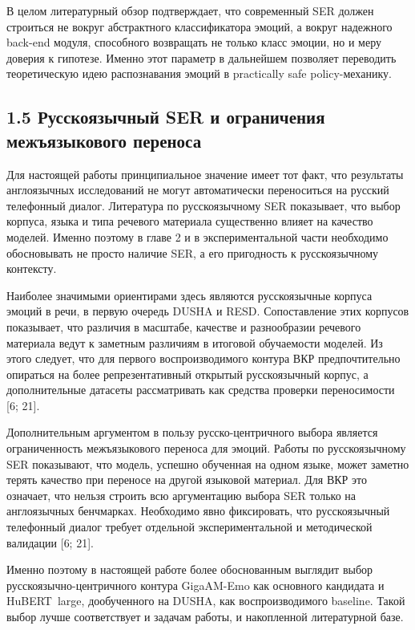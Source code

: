 \documentclass[a4paper,14pt]{extarticle}
\renewcommand{\texttt}[1]{\textnormal{#1}}
\begin{document}
В целом литературный обзор подтверждает, что современный \texttt{SER}
должен строиться не вокруг абстрактного классификатора эмоций, а вокруг
надежного back-end модуля, способного возвращать не только класс эмоции,
но и меру доверия к гипотезе. Именно этот параметр в дальнейшем
позволяет переводить теоретическую идею распознавания эмоций в
practically safe policy-механику.

\subsection{1.5 Русскоязычный SER и ограничения межъязыкового
переноса}\label{ux440ux443ux441ux441ux43aux43eux44fux437ux44bux447ux43dux44bux439-ser-ux438-ux43eux433ux440ux430ux43dux438ux447ux435ux43dux438ux44f-ux43cux435ux436ux44aux44fux437ux44bux43aux43eux432ux43eux433ux43e-ux43fux435ux440ux435ux43dux43eux441ux430}

Для настоящей работы принципиальное значение имеет тот факт, что
результаты англоязычных исследований не могут автоматически переноситься
на русский телефонный диалог. Литература по русскоязычному \texttt{SER}
показывает, что выбор корпуса, языка и типа речевого материала
существенно влияет на качество моделей. Именно поэтому в главе 2 и в
экспериментальной части необходимо обосновывать не просто наличие
\texttt{SER}, а его пригодность к русскоязычному контексту.

Наиболее значимыми ориентирами здесь являются русскоязычные корпуса
эмоций в речи, в первую очередь \texttt{DUSHA} и \texttt{RESD}.
Сопоставление этих корпусов показывает, что различия в масштабе,
качестве и разнообразии речевого материала ведут к заметным различиям в
итоговой обучаемости моделей. Из этого следует, что для первого
воспроизводимого контура ВКР предпочтительно опираться на более
репрезентативный открытый русскоязычный корпус, а дополнительные
датасеты рассматривать как средства проверки переносимости {[}6; 21{]}.

Дополнительным аргументом в пользу русско-центричного выбора является
ограниченность межъязыкового переноса для эмоций. Работы по
русскоязычному SER показывают, что модель, успешно обученная на одном
языке, может заметно терять качество при переносе на другой языковой
материал. Для ВКР это означает, что нельзя строить всю аргументацию
выбора \texttt{SER} только на англоязычных бенчмарках. Необходимо явно
фиксировать, что русскоязычный телефонный диалог требует отдельной
экспериментальной и методической валидации {[}6; 21{]}.

Именно поэтому в настоящей работе более обоснованным выглядит выбор
русскоязычно-центричного контура \texttt{GigaAM-Emo} как основного
кандидата и \texttt{HuBERT\ large}, дообученного на \texttt{DUSHA}, как
воспроизводимого baseline. Такой выбор лучше соответствует и задачам
работы, и накопленной литературной базе.
\end{document}
